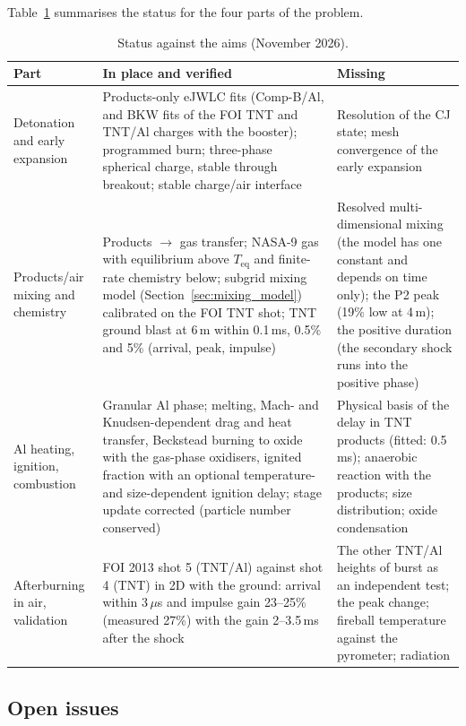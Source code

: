 \documentclass{article}
\begin{document}
Table~\ref{tab:status} summarises the status for the four parts of the problem.

\begin{table}[htbp]
    \centering
    \footnotesize
    \caption{Status against the aims (November 2026).}
    \label{tab:status}
    \begin{tabularx}{\textwidth}{>{\raggedright\arraybackslash}p{3.0cm}>{\raggedright\arraybackslash}X>{\raggedright\arraybackslash}X}
        \toprule
        \textbf{Part} & \textbf{In place and verified} & \textbf{Missing} \\
        \midrule
        Detonation and early expansion & Products-only eJWLC fits (Comp-B/Al, and BKW fits of the FOI TNT and TNT/Al charges with the booster); programmed burn; three-phase spherical charge, stable through breakout; stable charge/air interface & Resolution of the CJ state; mesh convergence of the early expansion \\
        Products/air mixing and chemistry & Products $\to$ gas transfer; NASA-9 gas with equilibrium above $T_\text{eq}$ and finite-rate chemistry below; subgrid mixing model (Section~\ref{sec:mixing_model}) calibrated on the FOI TNT shot; TNT ground blast at 6\,m within 0.1\,ms, 0.5\% and 5\% (arrival, peak, impulse) & Resolved multi-dimensional mixing (the model has one constant and depends on time only); the P2 peak (19\% low at 4\,m); the positive duration (the secondary shock runs into the positive phase) \\
        Al heating, ignition, combustion & Granular Al phase; melting, Mach- and Knudsen-dependent drag and heat transfer, Beckstead burning to oxide with the gas-phase oxidisers, ignited fraction with an optional temperature- and size-dependent ignition delay; stage update corrected (particle number conserved) & Physical basis of the delay in TNT products (fitted: 0.5\,ms); anaerobic reaction with the products; size distribution; oxide condensation \\
        Afterburning in air, validation & FOI 2013 shot 5 (TNT/Al) against shot 4 (TNT) in 2D with the ground: arrival within 3\,$\mu$s and impulse gain 23--25\% (measured 27\%) with the gain 2--3.5\,ms after the shock & The other TNT/Al heights of burst as an independent test; the peak change; fireball temperature against the pyrometer; radiation \\
        \bottomrule
    \end{tabularx}
\end{table}

\subsection{Open issues}
\end{document}
